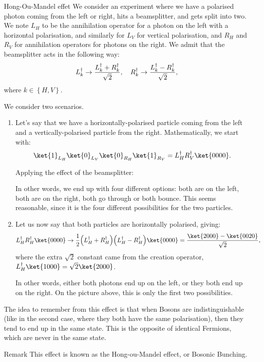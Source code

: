 \documentclass[a4paper]{article}
\begin{document}
\begin{parag}{Hong-Ou-Mandel effet}
    We consider an experiment where we have a polarised photon coming from the left or right, hits a beamsplitter, and gets split into two. We note $L_H$ to be the annihilation operator for a photon on the left with a horizontal polarisation, and similarly for $L_V$ for vertical polarisation, and $R_H$ and $R_V$ for annihilation operators for photons on the right. We admit that the beamsplitter acts in the following way: 
    \[L_k^{\dagger} \to \frac{L_k^{\dagger} + R_k^{\dagger}}{\sqrt{2}}, \quad R_k^{\dagger} \to \frac{L_k^{\dagger} - R_k^{\dagger}}{\sqrt{2}},\]
    where $k \in \left\{H, V\right\}$.

    We consider two scenarios.
    \begin{enumerate}[left=0pt]
        \item Let's say that we have a horizontally-polarised particle coming from the left and a vertically-polarised particle from the right. Mathematically, we start with: 
    \[\ket{1}_{L_H} \ket{0}_{L_V} \ket{0}_{R_H} \ket{1}_{R_V} = L_H^{\dagger} R_V^{\dagger} \ket{0000}.\]

    Applying the effect of the beamsplitter:

    In other words, we end up with four different options: both are on the left, both are on the right, both go through or both bounce. This seems reasonable, since it is the four different possibilities for the two particles.

    \item Let us now say that both particles are horizontally polarised, giving: 
    \[L_H^{\dagger} R_H^{\dagger} \ket{0000} \to \frac{1}{2} \left(L_H^{\dagger} + R_H^{\dagger}\right)\left(L_H^{\dagger} - R_H^{\dagger}\right) \ket{0000} = \frac{\ket{2000} - \ket{0020}}{\sqrt{2}},\]
    where the extra $\sqrt{2}$ constant came from the creation operator, $L_H^{\dagger} \ket{1000} = \sqrt{2} \ket{2000}$.

    In other words, either both photons end up on the left, or they both end up on the right. On the picture above, this is only the first two possibilities.
    \end{enumerate}

    The idea to remember from this effect is that when Bosons are indistinguishable (like in the second case, where they both have the same polarisation), then they tend to end up in the same state. This is the opposite of identical Fermions, which are never in the same state.
   
    \begin{subparag}{Remark}
        This effect is known as the Hong-ou-Mandel effect, or Bosonic Bunching.
    \end{subparag}
\end{parag}
\end{document}
